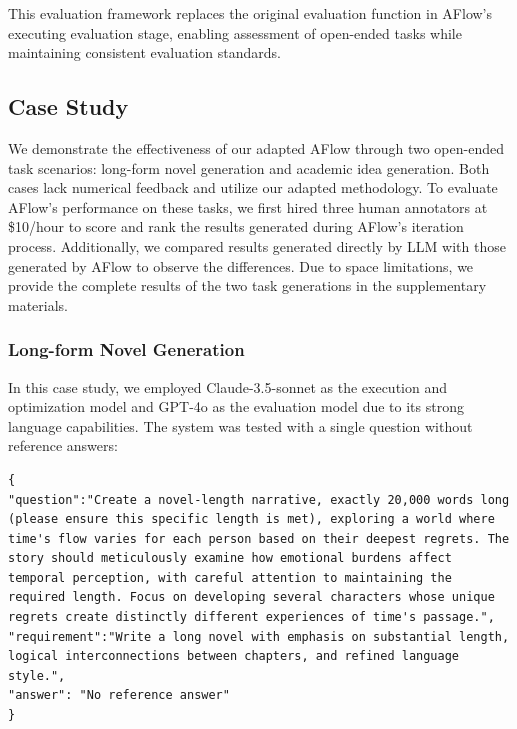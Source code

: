 \documentclass{article} %
\newcommand{\model}{{\sc AFlow}\xspace}
\theoremstyle{plain}
\theoremstyle{definition}
\theoremstyle{remark}
\begin{document}
This evaluation framework replaces the original evaluation function in \model's executing evaluation stage, enabling assessment of open-ended tasks while maintaining consistent evaluation standards.

\subsection{Case Study}
We demonstrate the effectiveness of our adapted \model through two open-ended task scenarios: long-form novel generation and academic idea generation. Both cases lack numerical feedback and utilize our adapted methodology. To evaluate \model's performance on these tasks, we first hired three human annotators at \$10/hour to score and rank the results generated during \model's iteration process. Additionally, we compared results generated directly by LLM with those generated by \model to observe the differences.
Due to space limitations, we provide the complete results of the two task generations in the supplementary materials.

\subsubsection{Long-form Novel Generation}
In this case study, we employed Claude-3.5-sonnet as the execution and optimization model and GPT-4o as the evaluation model due to its strong language capabilities. The system was tested with a single question without reference answers:

\label{appendix:Novel data}

\begin{tcolorbox}[title={\textbf{\small Novel data}}, boxrule=2pt, arc=0mm, breakable]\begin{verbatim}
{
"question":"Create a novel-length narrative, exactly 20,000 words long (please ensure this specific length is met), exploring a world where time's flow varies for each person based on their deepest regrets. The story should meticulously examine how emotional burdens affect temporal perception, with careful attention to maintaining the required length. Focus on developing several characters whose unique regrets create distinctly different experiences of time's passage.",
"requirement":"Write a long novel with emphasis on substantial length, logical interconnections between chapters, and refined language style.", 
"answer": "No reference answer"
}
\end{verbatim}
\end{tcolorbox}
\end{document}
